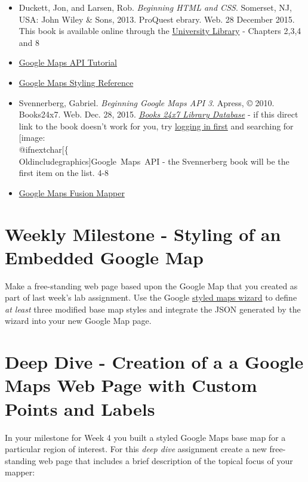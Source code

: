 \documentclass[]{book}
\makeatletter
\def\ScaleIfNeeded{%
  \ifdim\Gin@nat@width>.5\linewidth
    .5\linewidth
  \else
    \Gin@nat@width
  \fi
}
\let\Oldincludegraphics\texttt{[image: \%
 \\catcode`\\@=11\\relax\%
 \%\\gdef\\includegraphics\{\\@ifnextchar[\{\\Oldincludegraphics]}{\Oldincludegraphics[width=\ScaleIfNeeded]}}%
\gdef\texttt{[image: \\@ifnextchar[\{\\Oldincludegraphics]}{\Oldincludegraphics[max size={.75\textwidth}{.75\textheight}]}}%
\makeatother
\begin{document}
\begin{itemize}
\item
  Duckett, Jon, and Larsen, Rob. \emph{Beginning HTML and CSS}.
  Somerset, NJ, USA: John Wiley \& Sons, 2013. ProQuest ebrary. Web. 28
  December 2015. This book is available online through the
  \href{http://site.ebrary.com.libproxy.unm.edu/lib/unma/detail.action?docID=10667426}{University
  Library} - Chapters 2,3,4 and 8
\item
  \href{http://code.google.com/apis/maps/documentation/javascript/tutorial.html}{Google
  Maps API Tutorial}
\item
  \href{https://developers.google.com/maps/documentation/javascript/styling}{Google
  Maps Styling Reference}
\item
  Svennerberg, Gabriel. \emph{Beginning Google Maps API 3}. Apress, ©
  2010. Books24x7. Web. Dec. 28, 2015.
  \href{http://library.books24x7.com.libproxy.unm.edu/toc.aspx?bookid=36390\&refid=SVA3S}{\emph{Books
  24x7 Library Database}} - if this direct link to the book doesn't work
  for you, try
  \href{http://library.unm.edu/applications/dam/plink.php?db_id=238}{logging
  in first} and searching for \texttt{Google\ Maps\ API} - the
  Svennerberg book will be the first item on the list. 4-8
\item
  \href{http://earth.google.com/outreach/tutorial_fusion_yourowndata.html}{Google
  Maps Fusion Mapper}
\end{itemize}

\section{Weekly Milestone - Styling of an Embedded Google
Map}\label{week04-milestone}

Make a free-standing web page based upon the Google Map that you created
as part of last week's lab assignment. Use the Google
\href{http://gmaps-samples-v3.googlecode.com/svn/trunk/styledmaps/wizard/index.html}{styled
maps wizard} to define \emph{at least} three modified base map styles
and integrate the JSON generated by the wizard into your new Google Map
page.

\section{Deep Dive - Creation of a a Google Maps Web Page with Custom
Points and Labels}\label{week04-deepDive}

In your milestone for Week 4 you built a styled Google Maps base map for
a particular region of interest. For this \emph{deep dive} assignment
create a new free-standing web page that includes a brief description of
the topical focus of your mapper:
\end{document}
